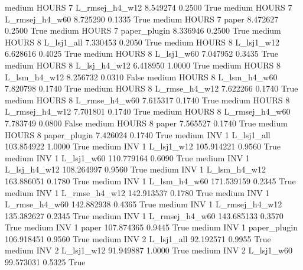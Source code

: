     medium    HOURS                 7 L_rmsej_h4_w12   8.549274      0.2500    True
    medium    HOURS                 7 L_rmsej_h4_w60   8.725290      0.1335    True
    medium    HOURS                 7          paper   8.472627      0.2500    True
    medium    HOURS                 7   paper_plugin   8.336946      0.2500    True
    medium    HOURS                 8     L_lsj1_all   7.330453      0.2050    True
    medium    HOURS                 8     L_lsj1_w12   6.628616      0.4025    True
    medium    HOURS                 8     L_lsj1_w60   7.047952      0.3435    True
    medium    HOURS                 8   L_lsj_h4_w12   6.418950      1.0000    True
    medium    HOURS                 8   L_lsm_h4_w12   8.256732      0.0310   False
    medium    HOURS                 8   L_lsm_h4_w60   7.820798      0.1740    True
    medium    HOURS                 8  L_rmse_h4_w12   7.622266      0.1740    True
    medium    HOURS                 8  L_rmse_h4_w60   7.615317      0.1740    True
    medium    HOURS                 8 L_rmsej_h4_w12   7.701801      0.1740    True
    medium    HOURS                 8 L_rmsej_h4_w60   7.783749      0.0800   False
    medium    HOURS                 8          paper   7.565527      0.1740    True
    medium    HOURS                 8   paper_plugin   7.426024      0.1740    True
    medium      INV                 1     L_lsj1_all 103.854922      1.0000    True
    medium      INV                 1     L_lsj1_w12 105.914221      0.9560    True
    medium      INV                 1     L_lsj1_w60 110.779164      0.6090    True
    medium      INV                 1   L_lsj_h4_w12 108.264997      0.9560    True
    medium      INV                 1   L_lsm_h4_w12 163.886051      0.1780    True
    medium      INV                 1   L_lsm_h4_w60 171.539159      0.2345    True
    medium      INV                 1  L_rmse_h4_w12 142.913537      0.1780    True
    medium      INV                 1  L_rmse_h4_w60 142.882938      0.4365    True
    medium      INV                 1 L_rmsej_h4_w12 135.382627      0.2345    True
    medium      INV                 1 L_rmsej_h4_w60 143.685133      0.3570    True
    medium      INV                 1          paper 107.874365      0.9445    True
    medium      INV                 1   paper_plugin 106.918451      0.9560    True
    medium      INV                 2     L_lsj1_all  92.192571      0.9955    True
    medium      INV                 2     L_lsj1_w12  91.949887      1.0000    True
    medium      INV                 2     L_lsj1_w60  99.573031      0.5325    True
